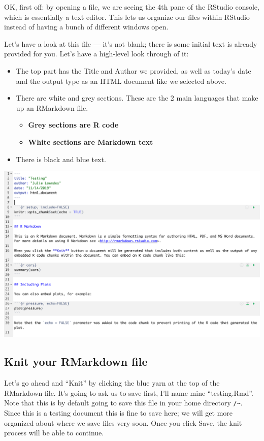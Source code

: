 \documentclass[]{book}
\providecommand{\tightlist}{%
  \setlength{\itemsep}{0pt}\setlength{\parskip}{0pt}}
\begin{document}
OK, first off: by opening a file, we are seeing the 4th pane of the RStudio console, which is essentially a text editor. This lets us organize our files within RStudio instead of having a bunch of different windows open.

Let's have a look at this file --- it's not blank; there is some initial text is already provided for you. Let's have a high-level look through of it:

\begin{itemize}
\tightlist
\item
  The top part has the Title and Author we provided, as well as today's date and the output type as an HTML document like we selected above.
\item
  There are white and grey sections. These are the 2 main languages that make up an RMarkdown file.

  \begin{itemize}
  \tightlist
  \item
    \textbf{Grey sections are R code}
  \item
    \textbf{White sections are Markdown text}
  \end{itemize}
\item
  There is black and blue text.
\end{itemize}

\includegraphics[width=0.8\linewidth]{img/rmarkdown}

\hypertarget{knit-your-rmarkdown-file}{%
\subsection{Knit your RMarkdown file}\label{knit-your-rmarkdown-file}}

Let's go ahead and ``Knit'' by clicking the blue yarn at the top of the RMarkdown file.
It's going to ask us to save first, I'll name mine ``testing.Rmd''. Note that this is by default going to save this file in your home directory \texttt{/\textasciitilde{}}. Since this is a testing document this is fine to save here; we will get more organized about where we save files very soon. Once you click Save, the knit process will be able to continue.
\end{document}
